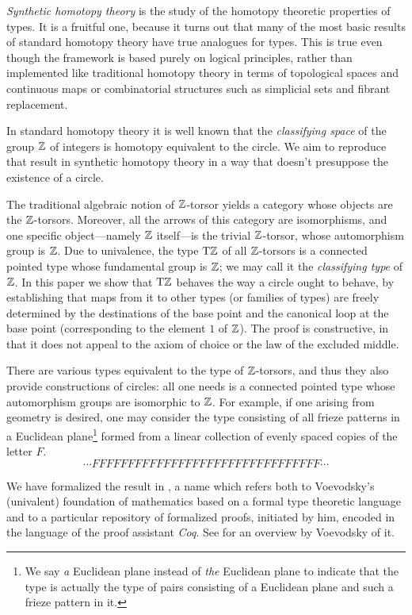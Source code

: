 \documentclass[a4paper,12pt]{amsart}
\begin{document}
\emph{Synthetic homotopy theory} is the study of the homotopy theoretic properties of types.  It is a fruitful one, because it turns out that many
of the most basic results of standard homotopy theory have true analogues for types.  This is true even though the framework is based purely on
logical principles, rather than implemented like traditional homotopy theory in terms of topological spaces and continuous maps or combinatorial
structures such as simplicial sets and fibrant replacement.

In standard homotopy theory it is well known that the \emph{classifying space} of the group $\mathbb{Z}$ of integers is
homotopy equivalent to the circle.  We aim to reproduce that result in synthetic homotopy theory in a way that doesn't presuppose the existence of a circle.

The traditional algebraic notion of $\mathbb{Z}$-torsor yields a category whose objects are the $\mathbb{Z}$-torsors.
Moreover, all the arrows of this category are isomorphisms, and
one specific object---namely $\mathbb{Z}$ itself---is the trivial $\mathbb{Z}$-torsor, whose automorphism group is $\mathbb{Z}$.
Due to univalence, the type ${\mathrm{T}\mathbb{Z}}$ of all $\mathbb{Z}$-torsors
is a connected pointed type whose fundamental group is $\mathbb{Z}$; we may call it the \emph{classifying type} of $\mathbb{Z}$.
In this paper we show that ${\mathrm{T}\mathbb{Z}}$ behaves the way a circle ought to behave,
by establishing that maps from it to other types (or families of types) are freely determined
by the destinations of the base point and the canonical loop at the base point (corresponding to the element $1$ of $\mathbb{Z}$).
The proof is constructive, in that it does not appeal to the axiom of choice or the law of the excluded middle.

There are various types equivalent to the type of $\mathbb{Z}$-torsors, and thus they also provide constructions of circles: all one needs is a
connected pointed type whose automorphism groups are isomorphic to $\mathbb{Z}$.  For example, if one arising from geometry is desired, one may
consider the type consisting of all frieze patterns in a Euclidean plane\footnote{%
  We say \emph{a} Euclidean plane instead of \emph{the} Euclidean
  plane to indicate that the type is actually the type of pairs consisting of a Euclidean plane and such a frieze pattern in it.}
formed from a
linear collection of evenly spaced copies of the letter $F$.
\[
  \cdots FFFFFFFFFFFFFFFFFFFFFFFFFFFFFFFF \cdots
\]

We have formalized the result in \UniMath{}, a name which refers both to Voevodsky's (univalent) foundation of mathematics based on a formal
type theoretic language and to a particular repository \cite{UniMath} of formalized proofs, initiated by him, encoded in the language of the
proof assistant \emph{Coq}.
See \cite{VV-UniMath-1} for an overview by Voevodsky of it.
\end{document}
